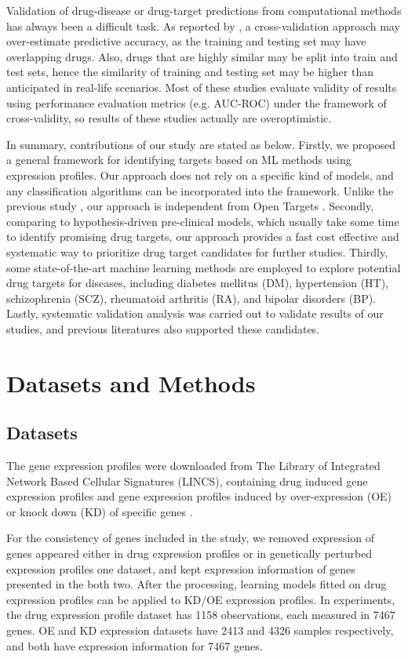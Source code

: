     Validation of drug-disease or drug-target predictions from computational methods has always been a difficult task. As reported by \cite{guney2017reproducible}, a cross-validation approach may over-estimate predictive accuracy, as the training and testing set may have overlapping drugs. Also, drugs that are highly similar may be split into train and test sets, hence the similarity of training and testing set may be higher than anticipated in real-life scenarios. Most of these studies evaluate validity of results using performance evaluation metrics (e.g. AUC-ROC) under the framework of cross-validity, so results of these studies actually are overoptimistic.

    In summary, contributions of our study are stated as below. Firstly, we proposed a general framework for identifying targets based on ML methods using expression profiles. Our approach does not rely on a specific kind of models, and any classification algorithms can be incorporated into the framework. Unlike the previous study \cite{ferrero2017silico}, our approach is independent from Open Targets \cite{koscielny2017open}. Secondly, comparing to hypothesis-driven pre-clinical models, which usually take some time to identify promising drug targets, our approach provides a fast cost effective and systematic way to prioritize drug target candidates for further studies. Thirdly, some state-of-the-art machine learning methods are employed to explore potential drug targets for diseases, including diabetes mellitus (DM), hypertension (HT), schizophrenia (SCZ),  rheumatoid arthritis (RA), and bipolar disorders (BP). Lastly, systematic validation analysis was carried out to validate results of our studies, and previous literatures also supported these candidates. 

\section{Datasets and Methods}
  \subsection{Datasets}
    The gene expression profiles were downloaded from The Library of Integrated Network Based Cellular Signatures (LINCS), containing drug induced gene expression profiles and gene  expression profiles induced by over-expression (OE) or knock down (KD) of specific genes \cite{subramanian2017next}. 
      
    For the consistency of genes included in the study, we removed expression of genes appeared either in drug expression profiles or in genetically perturbed expression profiles one dataset, and kept expression information of genes presented in the both two. After the processing, learning models fitted on drug expression profiles can be applied to KD/OE expression profiles. In experiments, the drug expression profile dataset has 1158 observations, each measured in 7467 genes. OE and KD expression datasets have 2413 and 4326 samples respectively, and both have expression information for 7467 genes.

